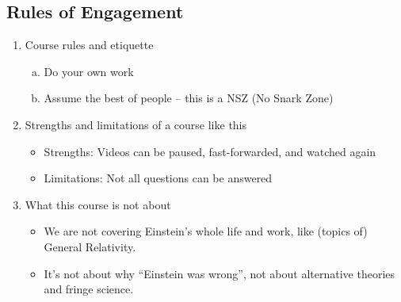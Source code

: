 \documentclass[pagesize,headsepline,10pt,parskip=half]{scrreprt}
\begin{document}
      \subsection{Rules of Engagement}
        \begin{enumerate}
          \item Course rules and etiquette
            \begin{enumerate}[a)]
              \item Do your own work\\
              \item Assume the best of people – this is a NSZ (No Snark Zone)
            \end{enumerate}
          \item Strengths and limitations of a course like this
            \begin{itemize}
              \item Strengths: Videos can be paused, fast-forwarded, and watched again
              \item Limitations: Not all questions can be answered
            \end{itemize}
          \item What this course is not about
            \begin{itemize}
              \item We are not covering Einstein’s whole life and work,
                like (topics of) General Relativity.
              \item It’s not about why “Einstein was wrong”,
                not about alternative theories and fringe science.
            \end{itemize}
        \end{enumerate}

      \clearpage
\end{document}
